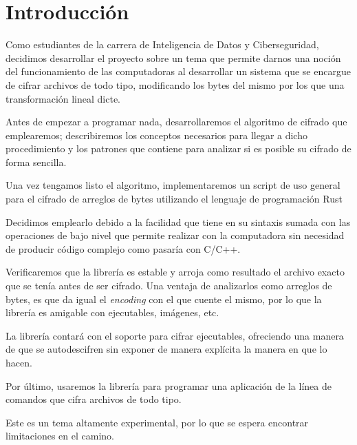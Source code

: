 \documentclass[a4paper]{article}
\begin{document}
\newpage
\section{Introducción}

Como estudiantes de la carrera de Inteligencia de Datos y Ciberseguridad,
decidimos desarrollar el proyecto sobre un tema que permite darnos una noción
del funcionamiento de las computadoras al desarrollar un sistema que se
encargue de cifrar archivos de todo tipo, modificando los bytes del mismo por
los que una transformación lineal dicte.

Antes de empezar a programar nada, desarrollaremos el algoritmo de cifrado que
emplearemos; describiremos los conceptos
necesarios para llegar a dicho procedimiento y los patrones que contiene para
analizar si es posible su cifrado de forma sencilla.

Una vez tengamos listo el algoritmo, implementaremos un script de uso
general para el cifrado de arreglos de bytes utilizando el lenguaje de programación Rust

Decidimos emplearlo debido a la facilidad que tiene en su
sintaxis sumada con las operaciones de bajo nivel que permite realizar con la
computadora sin necesidad de producir código complejo como pasaría con
C/C++.

Verificaremos que la librería es estable y arroja como resultado el archivo
exacto que se tenía antes de ser cifrado. Una ventaja de analizarlos
como arreglos de bytes, es que da igual el \textit{encoding} con el que cuente
el mismo, por lo que la librería es amigable con ejecutables, imágenes, etc.

La librería contará con el soporte para cifrar ejecutables, ofreciendo una
manera de que se autodescifren sin exponer de manera explícita la manera en que
lo hacen.

Por último, usaremos la librería para programar una aplicación de la línea
de comandos que cifra archivos de todo tipo.

Este es un tema altamente experimental, por lo que se espera encontrar
limitaciones en el camino.
\end{document}
